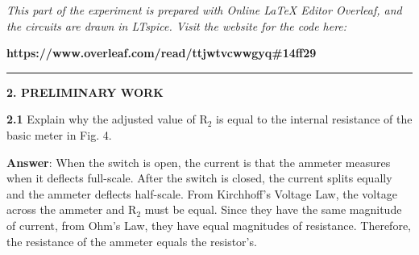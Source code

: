 \documentclass{article}
\begin{document}
\large

{\textit{This part of the experiment is prepared with Online LaTeX Editor Overleaf, and the circuits are drawn in LTspice. Visit the website for the code here:}}

{\textbf{https://www.overleaf.com/read/ttjwtvcwwgyq\#14ff29}}
\vspace{4mm}
\hrule
\vspace{4mm}
{\Large \textbf{2. PRELIMINARY WORK}}

\vspace{4mm}

{\textbf{2.1} Explain why the adjusted value of $\text{R}_2$ is equal to the internal resistance of the basic meter in Fig. 4.}

\vspace{4mm}

{\textbf{Answer}: When the switch is open, the current is that the ammeter measures when it deflects full-scale. After the switch is closed, the current splits equally and the ammeter deflects half-scale. From Kirchhoff's Voltage Law, the voltage across the ammeter and R$_2$ must be equal. Since they have the same magnitude of current, from Ohm's Law, they have equal magnitudes of resistance. Therefore, the resistance of the ammeter equals the resistor's.}










\end{document}
